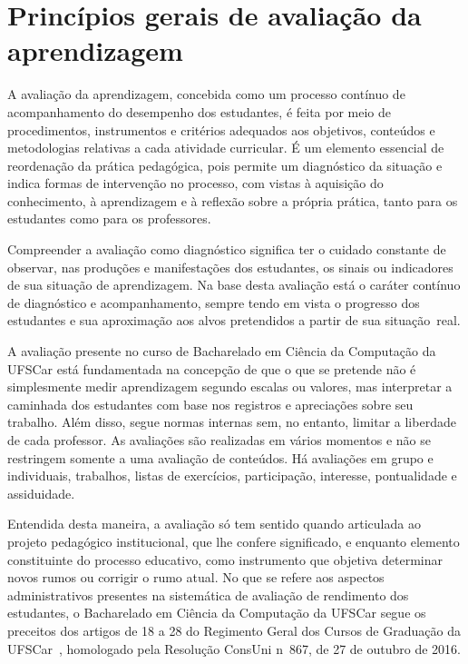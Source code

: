 \section{Princípios gerais de avaliação da aprendizagem}



A avaliação da aprendizagem, concebida como um processo contínuo de acompanhamento do
desempenho dos estudantes, é feita por meio de procedimentos, instrumentos e critérios adequados aos
objetivos, conteúdos e metodologias relativas a cada atividade curricular. É um elemento essencial de
reordenação da prática pedagógica, pois permite um diagnóstico da situação e indica formas de
intervenção no processo, com vistas à aquisição do conhecimento, à aprendizagem e à reflexão
sobre a própria prática, tanto para os estudantes como para os professores.

Compreender a avaliação como diagnóstico significa ter o cuidado constante de observar, nas
produções e manifestações dos estudantes, os sinais ou indicadores de sua situação de aprendizagem.
Na base desta avaliação está o caráter contínuo de diagnóstico e acompanhamento, sempre tendo
em vista o progresso dos estudantes e sua aproximação aos alvos pretendidos a partir de sua situação~real.

A avaliação presente no curso de Bacharelado em Ciência da Computação da UFSCar está
fundamentada na concepção de que o que se pretende não é simplesmente medir aprendizagem
segundo escalas ou valores, mas interpretar a caminhada dos estudantes com base nos registros e
apreciações sobre seu trabalho. Além disso, segue normas internas sem, no entanto, limitar a
liberdade de cada professor. As avaliações são realizadas em vários momentos e não se restringem
somente a uma avaliação de conteúdos. Há avaliações em grupo e individuais, trabalhos, listas de
exercícios, participação, interesse, pontualidade e assiduidade.

Entendida desta maneira, a avaliação só tem sentido quando articulada ao projeto
pedagógico institucional, que lhe confere significado, e enquanto elemento constituinte do processo
educativo, como instrumento que objetiva determinar novos rumos ou corrigir o rumo atual.
No que se refere aos aspectos administrativos presentes na sistemática de avaliação de
rendimento dos estudantes, o  Bacharelado em Ciência da Computação da UFSCar segue os
preceitos dos artigos de 18 a 28 do  Regimento Geral dos Cursos de Graduação da UFSCar~\cite{Regimento-Geral-CursosGraduacao-UFSCar}, homologado pela Resolução ConsUni n\textordmasculine~867, de 27 de outubro de 2016.  


